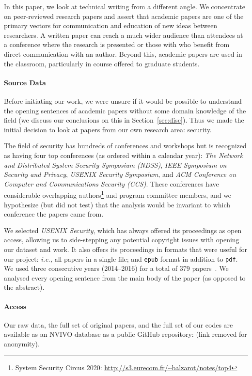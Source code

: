 \documentclass[sigconf,anonymous]{acmart}
\newcommand{\ie}{\textit{i.e.,}\xspace}
\begin{document}
In this paper, we look at technical writing from a different angle. We concentrate on peer-reviewed research papers and assert that academic papers are one of the primary vectors for communication and education of new ideas between researchers. A written paper can reach a much wider audience than attendees at a conference where the research is presented or those with who benefit from direct communication with an author. Beyond this, academic papers are used in the classroom, particularly in course offered to graduate students. 
	
\paragraph{Source Data} Before initiating our work, we were unsure if it would be possible to understand the opening sentences of academic papers without some domain knowledge of the field (we discuss our conclusions on this in Section~\ref{sec:disc}). Thus we made the initial decision to look at papers from our own research area: security. 

The field of security has hundreds of conferences and workshops but is recognized as having four top conferences (as ordered within a calendar year): \textit{The Network and Distributed System Security Symposium (NDSS)}, \textit{IEEE Symposium on Security and Privacy}, \textit{USENIX Security Symposium}, and \textit{ACM Conference on Computer and Communications Security (CCS)}. These conferences have considerable overlapping authors\footnote{System Security Circus 2020: \url{http://s3.eurecom.fr/~balzarot/notes/top4}} and program committee members, and we hypothesize (but did not test) that the analysis would be invariant to which conference the papers came from.

We selected \textit{USENIX Security}, which has always offered its proceedings as open access, allowing us to side-stepping any potential copyright issues with opening our dataset and work. It also offers its proceedings in formats that were useful for our project: \ie all papers in a single file; and \texttt{epub} format in addition to \texttt{pdf}. We used three consecutive years (2014--2016) for a total of 379 papers~\cite{usenix14,usenix15,usenix16}. We analysed every opening sentence from the main body of the paper (as opposed to the abstract).
	
\paragraph{Access} Our raw data, the full set of original papers, and the full set of our codes are available as an NVIVO database as a public GitHub repository: (link removed for anonymity). 
	
\end{document}
